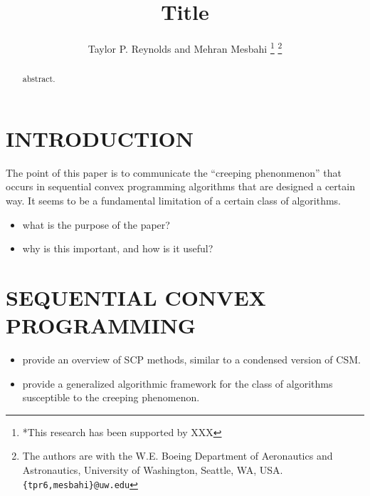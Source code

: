 \documentclass[letterpaper, 10 pt, conference]{ieeeconf}
\title{\LARGE \bf Title
}
\author{Taylor P. Reynolds and Mehran Mesbahi%
\thanks{*This research has been supported by XXX}%
\thanks{The authors are with the W.E. Boeing Department of Aeronautics and Astronautics,
        University of Washington, Seattle, WA, USA.
        {\tt\small \{tpr6,mesbahi\}@uw.edu}}%
}
\begin{document}
\maketitle
\thispagestyle{empty}
\pagestyle{empty}


\begin{abstract}

abstract.

\end{abstract}


\section{INTRODUCTION}\label{sec:intro}

The point of this paper is to communicate the ``creeping phenonmenon'' that occurs in sequential convex programming algorithms that are designed a certain way. It seems to be a fundamental limitation of a certain class of algorithms. 

\begin{itemize}
\item what is the purpose of the paper?
\item why is this important, and how is it useful?
\end{itemize}

\section{SEQUENTIAL CONVEX PROGRAMMING}\label{sec:scp}

\begin{itemize}
\item provide an overview of SCP methods, similar to a condensed version of CSM.
\item provide a generalized algorithmic framework for the class of algorithms susceptible to the creeping phenomenon.
\end{itemize}
\end{document}
